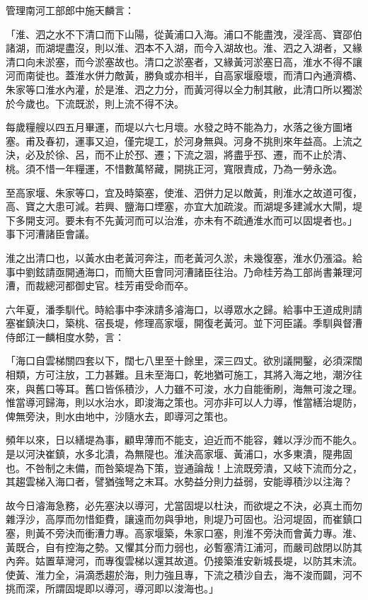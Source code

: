 管理南河工部郎中施天麟言：

「淮、泗之水不下清口而下山陽，從黃浦口入海。浦口不能盡洩，浸淫高、寶邵伯諸湖，而湖堤盡沒，則以淮、泗本不入湖，而今入湖故也。淮、泗之入湖者，又緣清口向未淤塞，而今淤塞故也。清口之淤塞者，又緣黃河淤塞日高，淮水不得不讓河而南徙也。蓋淮水併力敵黃，勝負或亦相半，自高家堰廢壞，而清口內通濟橋、朱家等口淮水內灌，於是淮、泗之力分，而黃河得以全力制其敝，此清口所以獨淤於今歲也。下流既淤，則上流不得不決。

每歲糧艘以四五月畢運，而堤以六七月壞。水發之時不能為力，水落之後方圖堵塞。甫及春初，運事又迫，僅完堤工，於河身無與。河身不挑則來年益高。上流之決，必及於徐、呂，而不止於邳、遷；下流之涸，將盡乎邳、遷，而不止於清、桃。須不惜一年糧運，不惜數萬帑藏，開挑正河，寬限責成，乃為一勞永逸。

至高家堰、朱家等口，宜及時築塞，使淮、泗併力足以敵黃，則淮水之故道可復，高、寶之大患可減。若興、鹽海口堙塞，亦宜大加疏浚。而湖堤多建減水大閘，堤下多開支河。要未有不先黃河而可以治淮，亦未有不疏通淮水而可以固堤者也。」事下河漕諸臣會議。

淮之出清口也，以黃水由老黃河奔注，而老黃河久淤，未幾復塞，淮水仍漲溢。給事中劉鉉請亟開通海口，而簡大臣會同河漕諸臣往治。乃命桂芳為工部尚書兼理河漕，而裁總河都御史官。桂芳甫受命而卒。

六年夏，潘季馴代。時給事中李淶請多濬海口，以導眾水之歸。給事中王道成則請塞崔鎮決口，築桃、宿長堤，修理高家堰，開復老黃河。並下河臣議。季馴與督漕侍郎江一麟相度水勢，言：

「海口自雲梯關四套以下，闊七八里至十餘里，深三四丈。欲別議開鑿，必須深闊相類，方可注放，工力甚難。且未至海口，乾地猶可施工，其將入海之地，潮汐往來，與舊口等耳。舊口皆係積沙，人力雖不可浚，水力自能衝刷，海無可浚之理。惟當導河歸海，則以水治水，即浚海之策也。河亦非可以人力導，惟當繕治堤防，俾無旁決，則水由地中，沙隨水去，即導河之策也。

頻年以來，日以繕堤為事，顧卑薄而不能支，迫近而不能容，雜以浮沙而不能久。是以河決崔鎮，水多北潰，為無隄也。淮決高家堰、黃浦口，水多東潰，隄弗固也。不咎制之未備，而咎築堤為下策，豈通論哉！上流既旁潰，又岐下流而分之，其趨雲梯入海口者，譬猶強弩之末耳。水勢益分則力益弱，安能導積沙以注海？

故今日濬海急務，必先塞決以導河，尤當固堤以杜決，而欲堤之不決，必真土而勿雜浮沙，高厚而勿惜鉅費，讓遠而勿與爭地，則堤乃可固也。沿河堤固，而崔鎮口塞，則黃不旁決而衝漕力專。高家堰築，朱家口塞，則淮不旁決而會黃力專。淮、黃既合，自有控海之勢。又懼其分而力弱也，必暫塞清江浦河，而嚴司啟閉以防其內奔。姑置草灣河，而專復雲梯以還其故道。仍接築淮安新城長堤，以防其末流。使黃、淮力全，涓滴悉趨於海，則力強且專，下流之積沙自去，海不浚而闢，河不挑而深，所謂固堤即以導河，導河即以浚海也。」

